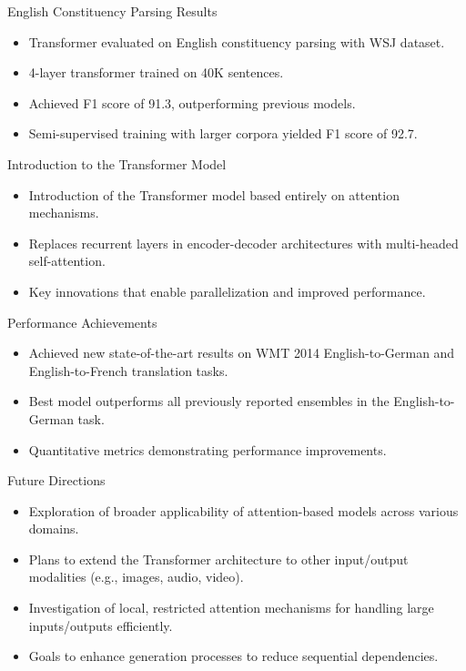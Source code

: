 \documentclass{beamer}
\begin{document}
\begin{frame}{English Constituency Parsing Results}
\begin{itemize}
\item Transformer evaluated on English constituency parsing with WSJ dataset.
\item 4-layer transformer trained on 40K sentences.
\item Achieved F1 score of 91.3, outperforming previous models.
\item Semi-supervised training with larger corpora yielded F1 score of 92.7.
\end{itemize}
\end{frame}

\begin{frame}{Introduction to the Transformer Model}
\begin{itemize}
\item Introduction of the Transformer model based entirely on attention mechanisms.
\item Replaces recurrent layers in encoder-decoder architectures with multi-headed self-attention.
\item Key innovations that enable parallelization and improved performance.
\end{itemize}
\end{frame}

\begin{frame}{Performance Achievements}
\begin{itemize}
\item Achieved new state-of-the-art results on WMT 2014 English-to-German and English-to-French translation tasks.
\item Best model outperforms all previously reported ensembles in the English-to-German task.
\item Quantitative metrics demonstrating performance improvements.
\end{itemize}
\end{frame}

\begin{frame}{Future Directions}
\begin{itemize}
\item Exploration of broader applicability of attention-based models across various domains.
\item Plans to extend the Transformer architecture to other input/output modalities (e.g., images, audio, video).
\item Investigation of local, restricted attention mechanisms for handling large inputs/outputs efficiently.
\item Goals to enhance generation processes to reduce sequential dependencies.
\end{itemize}
\end{frame}
\end{document}
